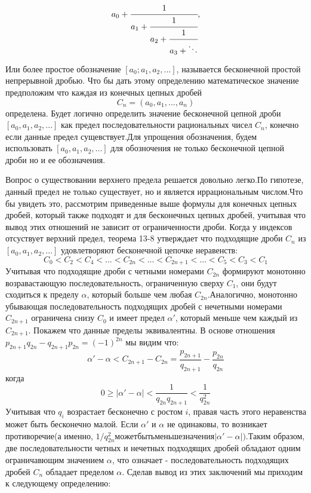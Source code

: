 \documentclass[11pt]{article}
\begin{document}
		$$a_0+\cfrac{1}{a_1+\cfrac{1}{a_2+\cfrac{1}{a_3+\ddots}}},$$
		
Или более простое обозначение $[a_0;a_1,a_2,...]$, называется бесконечной простой непрерывной дробью. Что бы дать этому определению математическое значение предположим что каждая из конечных цепных дробей
$$C_n=(a_0,a_1,...,a_n)$$
определена. Будет логично определить значение бесконечной цепной дроби $[a_0,a_1,a_2,...]$ как предел последовательности рациональных чисел $C_n$, конечно если данные предел сущевствует.Для упрощения обозначения, будем использовать $[a_0,a_1,a_2,...]$ для обозночения не только бесконечной цепной дроби но и ее обозначения.

Вопрос о существовании верхнего предела решается довольно легко.По гипотезе, данный предел не только существует, но и является иррациональным числом.Что бы увидеть это, рассмотрим приведенные выше формулы для конечных цепных дробей, который также подходят и для бесконечных цепных дробей, учитывая что вывод этих отношений не зависит от ограниченности дроби. Когда у индексов отсуствует верхний предел, теорема 13-8 утверждает что подходящие дроби $C_n$ из $[a_0,a_1,a_2,...]$ удовлетворяют бесконечной цепочке неравенств:
$$C_0<C_2<C_4<...<C_{2n}<...<C_{2n+1}<...<C_5<C_3<C_1$$
Учитывая что подходящие дроби с четными номерами $C_{2n}$ формируют монотонно возравастающую последовательность, ограниченную сверху $C_1$, они будут сходиться к пределу $\alpha$, который больше чем любая $C_{2n}$.Аналогично, монотонно убывающая последовательность подходящих дробей с нечетными номерами $C_{2n+1}$ ограничена снизу $C_0$ и имеет предел $\alpha'$, который меньше чем каждый из $C_{2n+1}$. Покажем что данные пределы эквивалентны. В основе отношения $p_{2n+1}q_{2n}-q_{2n+1}p_{2n}=(-1)^{2n}$ мы видим что:
$$\alpha'-\alpha<C_{2n+1}-C_{2n}=\frac{p_{2n+1}}{q_{2n+1}}-\frac{p_{2n}}{q_{2n}}$$
когда
$$0\ge|\alpha'-\alpha|<\frac{1}{q_{2n}q_{2n+1}}<\frac{1}{q_{2n}^2}$$
Учитывая что $q_i$ возрастает бесконечно с ростом $i$, правая часть этого неравенства может быть бесконечно малой. Если $\alpha'$ и $\alpha$ не одинаковы, то возникает противоречие(а именно, $1/q_{2n}^2 может быть меньше значения |\alpha'-\alpha|)$.Таким образом, две последовательности четных и нечетных подходящих дробей обладают одним ограничавющим значением $\alpha$, что означает - последовательность подходящих дробей $C_n$ обладает пределом $\alpha$.
Сделав вывод из этих заключений мы приходим к следующему определению:
\end{document}

